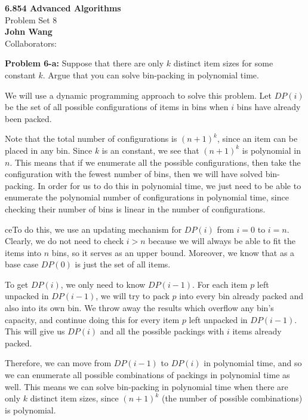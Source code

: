 \documentclass[psamsfonts]{amsart}
\newenvironment{sol}{\vspace{0.25cm}{\large \bfseries Solution:}}{\qedsymbol}
\newenvironment{prob}[1]{\begin{framed}{\large \bfseries Problem #1:}}{\end{framed}}
\newcommand{\makenewtitle}{
    \begin{center}
    {\huge \bfseries 6.854 Advanced Algorithms} \\
    Problem Set 8\\
    \vspace{0.25cm}
    {\bfseries John Wang} \\
    Collaborators:  
    \end{center}
    \vspace{0.5cm}
}
\begin{document}
\newpage
\makenewtitle
 
\begin{prob}{6-a}
Suppose that there are only $k$ distinct item sizes for some constant $k$. Argue that you can solve bin-packing in polynomial time.
\end{prob}
\begin{sol}
We will use a dynamic programming approach to solve this problem. Let $DP(i)$ be the set of all possible configurations of items in bins when $i$ bins have already been packed. 

Note that the total number of configurations is $(n+1)^k$, since an item can be placed in any bin. Since $k$ is an constant, we see that $(n+1)^k$ is polynomial in $n$. This means that if we enumerate all the possible configurations, then take the configuration with the fewest number of bins, then we will have solved bin-packing. In order for us to do this in polynomial time, we just need to be able to enumerate the polynomial number of configurations in polynomial time, since checking their number of bins is linear in the number of configurations.

ceTo do this, we use an updating mechanism for $DP(i)$ from $i=0$ to $i=n$. Clearly, we do not need to check $i > n$ because we will always be able to fit the items into $n$ bins, so it serves as an upper bound. Moreover, we know that as a base case $DP(0)$ is just the set of all items. 

To get $DP(i)$, we only need to know $DP(i-1)$. For each item $p$ left unpacked in $DP(i-1)$, we will try to pack $p$ into every bin already packed and also into its own bin. We throw away the results which overflow any bin's capacity, and continue doing this for every item $p$ left unpacked in $DP(i-1)$. This will give us $DP(i)$ and all the possible packings with $i$ items already packed.

Therefore, we can move from $DP(i-1)$ to $DP(i)$ in polynomial time, and so we can enumerate all possible combinations of packings in polynomial time as well. This means we can solve bin-packing in polynomial time when there are only $k$ distinct item sizes, since $(n+1)^k$ (the number of possible combinations) is polynomial.
\end{sol}
\end{document}
